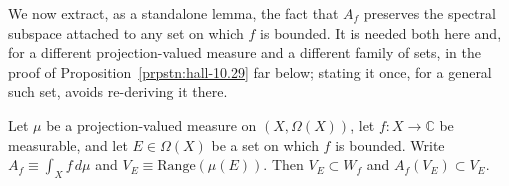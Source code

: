 We now extract, as a standalone lemma, the fact that $A_f$ preserves the spectral subspace attached to any set on which $f$ is bounded. It is needed both here and, for a different projection-valued measure and a different family of sets, in the proof of Proposition~\ref{prpstn:hall-10.29} far below; stating it once, for a general such set, avoids re-deriving it there.

\begin{lemma}
    \label{lmm:integral-preserves-spectral-subspaces}
    \leanok
    Let $\mu$ be a projection-valued measure on $(X,\Omega(X))$, let $f : X \to \mathbb{C}$ be measurable, and let $E \in \Omega(X)$ be a set on which $f$ is bounded. Write $A_f \equiv \int_X f\,d\mu$ and $V_E \equiv \text{Range}(\mu(E))$. Then $V_E \subset W_f$ and $A_f(V_E) \subset V_E$.
\end{lemma}
